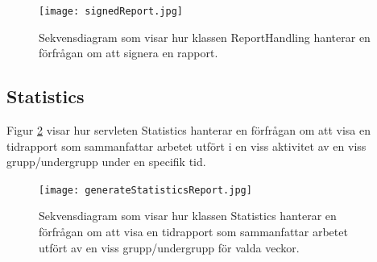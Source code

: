 \documentclass[a4paper]{article}
\begin{document}
\begin{figure}[h!]
\centering
\texttt{[image: signedReport.jpg]}
\caption{Sekvensdiagram som visar hur klassen ReportHandling hanterar en förfrågan om att signera en rapport.
\label{signedReport}}
\end{figure}

\subsection{Statistics}
Figur \ref{generateStatisticsReport} visar hur servleten Statistics hanterar en förfrågan om att visa en tidrapport som sammanfattar arbetet utfört i en viss aktivitet av en viss grupp/undergrupp under en specifik tid.

\begin{figure}[h!]
\centering
\texttt{[image: generateStatisticsReport.jpg]}
\caption{Sekvensdiagram som visar hur klassen Statistics hanterar en förfrågan om att visa en tidrapport som sammanfattar arbetet utfört av en viss grupp/undergrupp för valda veckor.
\label{generateStatisticsReport}}
\end{figure}
\end{document}
